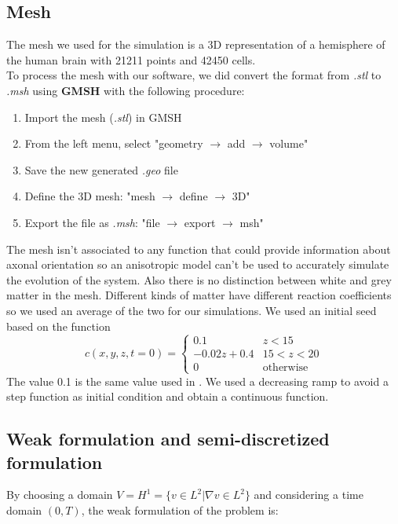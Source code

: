 \documentclass[12pt, letterpaper]{article}
\begin{document}
\subsection{Mesh}
The mesh we used for the simulation is a 3D representation of a hemisphere of the human brain with 21211 points and 42450 cells.\\
To process the mesh with our software, we did convert the format from \textit{.stl} to \textit{.msh} using \textbf{GMSH} with the following procedure:
\begin{enumerate}
    \item Import the mesh (\textit{.stl}) in GMSH
    \item From the left menu, select "geometry $\rightarrow$ add $\rightarrow$ volume"
    \item Save the new generated \textit{.geo} file
    \item Define the 3D mesh: "mesh $\rightarrow$ define $\rightarrow$ 3D"
    \item Export the file as \textit{.msh}: "file $\rightarrow$ export $\rightarrow$ msh"
\end{enumerate}

\noindent The mesh isn't associated to any function that could provide information about axonal orientation so an anisotropic model can't be used to accurately simulate the evolution of the system.
\noindent Also there is no distinction between white and grey matter in the mesh. Different kinds of matter have different reaction coefficients so we used an average of the two for our simulations. 
\noindent We used an initial seed based on the function $$c(x,y,z,t=0)=\begin{cases}0.1&z<15\\-0.02z+0.4&15<z<20\\0&\text{otherwise}\end{cases}$$
\noindent The value 0.1 is the same value used in \cite{diffusion-paper}.
\noindent We used a decreasing ramp to avoid a step function as initial condition and obtain a continuous function.
\subsection{Weak formulation and semi-discretized formulation}
By choosing a domain $V=H^1=\{v\in L^2|\nabla v\in L^2\}$ and considering a time domain $(0, T)$, the weak formulation of the problem is:
\end{document}
